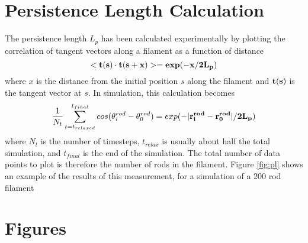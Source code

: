 \documentclass[11pt]{article}
\begin{document}
\section{Persistence Length Calculation}
The persistence length $L_p$ has been calculated experimentally by plotting the correlation of tangent vectors along a
filament as a function of distance \cite{ott}
\begin{equation}
  <\bf{t}(s)\cdot\bf{t}(s+x)>=exp(-x/2L_p)
  \label{eqn:pl}
\end{equation}
where $x$ is the distance from the initial position $s$ along the filament and $\bf{t}(s)$ is the tangent vector at $s$.
In simulation, this calculation becomes 
\begin{equation}
  {1\over N_t}\sum_{t=t_{relaxed}}^{t_{final}}{cos(\theta^{rod}_i -
  \theta^{rod}_0)}=exp(-|\bf{r}^{rod}_i-\bf{r}^{rod}_0|/2L_p)
  \label{eqn:pl_discrete}
\end{equation}
where $N_t$ is the number of timesteps, $t_{relax}$ is usually about half the total simulation, and $t_{final}$ is the
end of the simulation. The total number of data points to plot is therefore the number of rods in the filament. 
Figure \ref{fig:pl} shows an example of the results of this measurement, for a simulation of a 200 rod filament 
\newpage
\section{Figures}
\newpage


\end{document}
